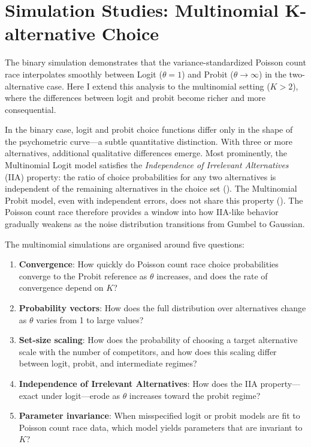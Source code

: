 \documentclass[
  man,
  floatsintext,
  longtable,
  a4paper,
  nolmodern,
  notxfonts,
  notimes,
  colorlinks=true,linkcolor=blue,citecolor=blue,urlcolor=blue]{apa7}
\providecommand{\tightlist}{%
  \setlength{\itemsep}{0pt}\setlength{\parskip}{0pt}}
\begin{document}
\section{Simulation Studies: Multinomial K-alternative
Choice}\label{sec-multinomial-simulations}

The binary simulation demonstrates that the variance-standardized
Poisson count race interpolates smoothly between Logit (\(\theta = 1\))
and Probit (\(\theta \to \infty\)) in the two-alternative case. Here I
extend this analysis to the multinomial setting (\(K > 2\)), where the
differences between logit and probit become richer and more
consequential.

In the binary case, logit and probit choice functions differ only in the
shape of the psychometric curve---a subtle quantitative distinction.
With three or more alternatives, additional qualitative differences
emerge. Most prominently, the Multinomial Logit model satisfies the
\emph{Independence of Irrelevant Alternatives} (IIA) property: the ratio
of choice probabilities for any two alternatives is independent of the
remaining alternatives in the choice set
(). The
Multinomial Probit model, even with independent errors, does not share
this property (). The Poisson count race therefore provides a window into
how IIA-like behavior gradually weakens as the noise distribution
transitions from Gumbel to Gaussian.

The multinomial simulations are organised around five questions:

\begin{enumerate}
\def\labelenumi{\arabic{enumi}.}
\tightlist
\item
  \textbf{Convergence}: How quickly do Poisson count race choice
  probabilities converge to the Probit reference as \(\theta\)
  increases, and does the rate of convergence depend on \(K\)?
\item
  \textbf{Probability vectors}: How does the full distribution over
  alternatives change as \(\theta\) varies from 1 to large values?
\item
  \textbf{Set-size scaling}: How does the probability of choosing a
  target alternative scale with the number of competitors, and how does
  this scaling differ between logit, probit, and intermediate regimes?
\item
  \textbf{Independence of Irrelevant Alternatives}: How does the IIA
  property---exact under logit---erode as \(\theta\) increases toward
  the probit regime?
\item
  \textbf{Parameter invariance}: When misspecified logit or probit
  models are fit to Poisson count race data, which model yields
  parameters that are invariant to \(K\)?
\end{enumerate}
\end{document}
